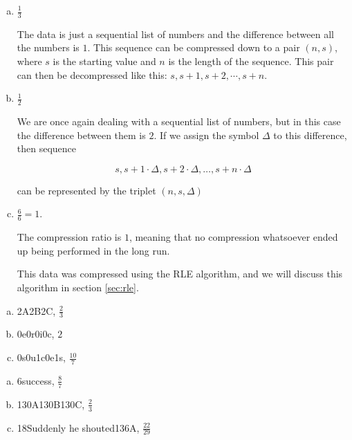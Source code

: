 \begin{Answer}[ref={compression-ratio}]

  \begin{enumerate}[(a)]
  \item $\frac{1}{3}$

    The data is just a sequential list of numbers and the difference
    between all the numbers is $1$. This sequence can be compressed
    down to a pair $(n,s)$, where $s$ is the starting value and $n$ is
    the length of the sequence. This pair can then be decompressed
    like this: $s,s+1,s+2,\cdots,s+n$.

  \item $\frac{1}{2}$

    We are once again dealing with a sequential list of numbers, but
    in this case the difference between them is $2$. If we assign the
    symbol $\Delta$ to this difference, then sequence

    \begin{equation*}
      s, s + 1 \cdot \Delta, s + 2 \cdot \Delta, \dots, s + n \cdot \Delta
    \end{equation*}

    can be represented by the triplet $(n,s,\Delta)$

  \item $\frac{6}{6} = 1$.

    The compression ratio is $1$, meaning that no compression
    whatsoever ended up being performed in the long run.

    This data was compressed using the RLE algorithm, and we will
    discuss this algorithm in section \ref{sec:rle}.

  \end{enumerate}
\end{Answer}

\begin{Answer}[ref={rle-compression}]

  \begin{enumerate}[(a)]
  \item 2A2B2C, $\frac{2}{3}$
  \item 0e0r0i0c, $2$
  \item 0s0u1c0e1s, $\frac{10}{7}$
  \end{enumerate}

\end{Answer}

\begin{Answer}[ref={packbits-rle}]

  \begin{enumerate}[(a)]
  \item 6success, $\frac{8}{7}$
  \item 130A130B130C, $\frac{2}{3}$
  \item 18Suddenly he shouted136A, $\frac{22}{29}$
  \end{enumerate}

\end{Answer}

